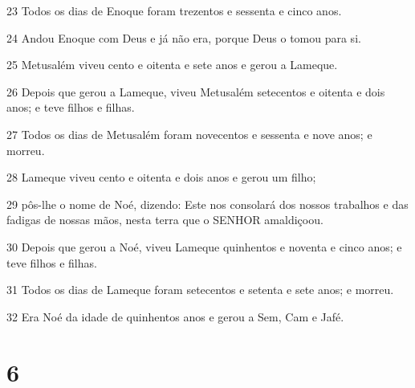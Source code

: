 \par 23 Todos os dias de Enoque foram trezentos e sessenta e cinco anos.
\par 24 Andou Enoque com Deus e já não era, porque Deus o tomou para si.
\par 25 Metusalém viveu cento e oitenta e sete anos e gerou a Lameque.
\par 26 Depois que gerou a Lameque, viveu Metusalém setecentos e oitenta e dois anos; e teve filhos e filhas.
\par 27 Todos os dias de Metusalém foram novecentos e sessenta e nove anos; e morreu.
\par 28 Lameque viveu cento e oitenta e dois anos e gerou um filho;
\par 29 pôs-lhe o nome de Noé, dizendo: Este nos consolará dos nossos trabalhos e das fadigas de nossas mãos, nesta terra que o SENHOR amaldiçoou.
\par 30 Depois que gerou a Noé, viveu Lameque quinhentos e noventa e cinco anos; e teve filhos e filhas.
\par 31 Todos os dias de Lameque foram setecentos e setenta e sete anos; e morreu.
\par 32 Era Noé da idade de quinhentos anos e gerou a Sem, Cam e Jafé.

\chapter{6}

